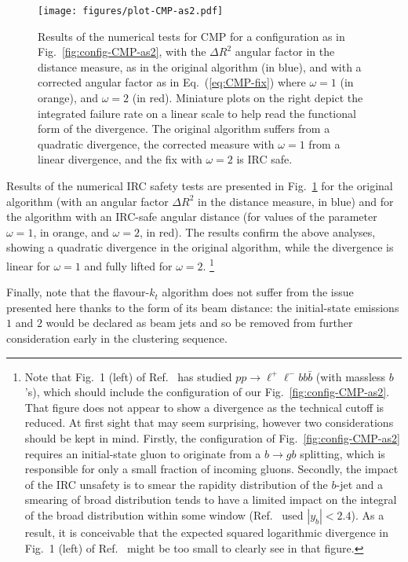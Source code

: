 \documentclass[nofootinbib,twocolumn,preprintnumbers,superscriptaddress,aps]{revtex4-2}
\begin{document}
\begin{figure}
  \centering
  \texttt{[image: figures/plot-CMP-as2.pdf]}
  \caption{
    Results of the numerical tests for CMP for a configuration as
    in Fig.~\ref{fig:config-CMP-as2}, with the $\Delta R^2$ angular
    factor in the distance measure, as in the original algorithm (in blue), and
    with a corrected angular factor as in Eq.~(\ref{eq:CMP-fix}) where
    $\omega=1$ (in orange), and $\omega=2$ (in red).
    Miniature plots on the right depict the integrated failure
    rate on a linear scale to help read the functional form
    of the divergence.
    The original algorithm suffers from a quadratic divergence, the
    corrected measure with $\omega=1$ from a linear divergence, and
    the fix with $\omega=2$ is IRC safe.}
  \label{fig:config-CMP-as2-num}
\end{figure}

Results of the numerical IRC safety tests are presented in
Fig.~\ref{fig:config-CMP-as2-num} for the original algorithm (with an
angular factor $\Delta R^2$ in the distance measure, in blue) and for
the algorithm with an IRC-safe angular distance (for values of the
parameter $\omega=1$, in orange, and $\omega=2$, in red).  The results
confirm the above analyses, showing a quadratic divergence in the
original algorithm, while the divergence is linear for $\omega=1$ and
fully lifted for $\omega = 2$.%
%
\footnote{Note that Fig.~1 (left) of Ref.~\cite{Czakon:2022wam} has
  studied $pp \to \ell^+\ell^- bb\bar b$ (with massless $b$'s), which
  should include the configuration of our Fig.~\ref{fig:config-CMP-as2}.
  That figure does not appear to show a divergence as the technical
  cutoff is reduced.
  At first sight that may seem surprising, however two considerations
  should be kept in mind.
  Firstly, the configuration of Fig.~\ref{fig:config-CMP-as2}
  requires an initial-state gluon to originate from a $b \to gb$ splitting,
  which is responsible for only a small fraction of incoming
  gluons. 
  Secondly, the impact of the IRC unsafety is to smear the rapidity
  distribution of the $b$-jet and a smearing of broad distribution
  tends to have a limited impact on the integral of the broad
  distribution within some window (Ref.~\cite{Czakon:2022wam} used $|y_b|<2.4$).
  As a result, it is conceivable that the expected squared logarithmic
  divergence in Fig.~1 (left) of Ref.~\cite{Czakon:2022wam} might be
  too small to clearly see in that figure. }

Finally, note that the flavour-$k_t$ algorithm does not suffer from
the issue presented here thanks to the form of its beam distance: the
initial-state emissions $1$ and $2$ would be declared as beam jets and so be
removed from further consideration early in the clustering sequence.
\end{document}
